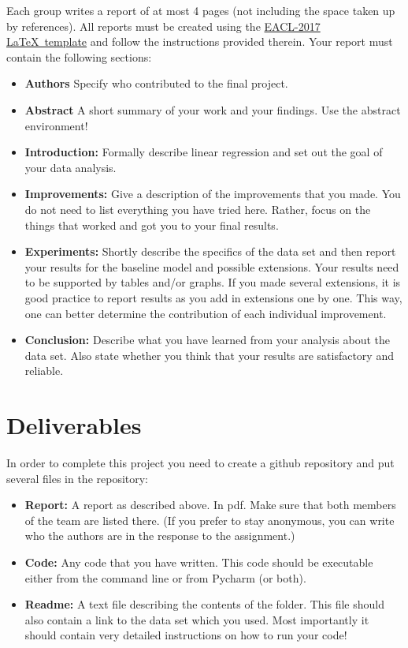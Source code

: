 \documentclass[11pt, leqno, a4paper]{article}
\begin{document}
Each group writes a report of at most 4 pages (not including the space
taken up by references). All reports must be created using the 
\href{http://eacl2017.org/images/site/eacl-2017-template.zip}{EACL-2017 \LaTeX \ template} and follow the instructions provided therein. Your report must
contain the following sections:
\begin{itemize}
\item \textbf{Authors} Specify who contributed to the final project.
\item \textbf{Abstract} A short summary of your work and your findings. Use the abstract environment!
\item \textbf{Introduction:} Formally describe linear regression and set out the goal of your data
analysis.
\item \textbf{Improvements:} Give a description of the improvements that you made. You do not
need to list everything you have tried here. Rather, focus on the things that worked and got you to
your final results.
\item \textbf{Experiments:} Shortly describe the specifics of the data set and then report your results for the baseline model
and possible extensions. Your results need to be supported by tables and/or graphs. If you made several
extensions, it is good practice to report results as you add in extensions one by one. This way, one can
better determine the contribution of each individual improvement.
\item \textbf{Conclusion:} Describe what you have learned from your analysis about the data set. Also
state whether you think that your results are satisfactory and reliable.
\end{itemize}

\section{Deliverables}
In order to complete this project you need to create a github repository and put several files in the repository:
\begin{itemize}
    \item \textbf{Report:} A report as described above. In pdf. Make sure that both members of the team are listed there. (If you prefer to stay anonymous, you can write who the authors are in the response to the assignment.)
\item \textbf{Code:} Any code that you have written. This code should be executable either from the command line or from Pycharm (or both).
\item \textbf{Readme:} A text file describing the contents of the folder. This file should also contain a link to the data set which you used. Most importantly
it should contain very detailed instructions on how to run your code!
\end{itemize}
\end{document}
